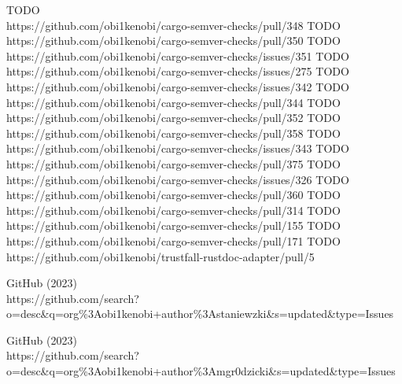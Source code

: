 \documentclass[licencjacka,en]{pracamgr}
\begin{document}
\begin{thebibliography}{99}
 TODO \\ https://github.com/obi1kenobi/cargo-semver-checks/pull/348
 TODO \\ https://github.com/obi1kenobi/cargo-semver-checks/pull/350
 TODO \\ https://github.com/obi1kenobi/cargo-semver-checks/issues/351
 TODO \\ https://github.com/obi1kenobi/cargo-semver-checks/issues/275
 TODO \\ https://github.com/obi1kenobi/cargo-semver-checks/issues/342
 TODO \\ https://github.com/obi1kenobi/cargo-semver-checks/pull/344
 TODO \\ https://github.com/obi1kenobi/cargo-semver-checks/pull/352
 TODO \\ https://github.com/obi1kenobi/cargo-semver-checks/pull/358
 TODO \\ https://github.com/obi1kenobi/cargo-semver-checks/issues/343
 TODO \\ https://github.com/obi1kenobi/cargo-semver-checks/pull/375
 TODO \\ https://github.com/obi1kenobi/cargo-semver-checks/issues/326
 TODO \\ https://github.com/obi1kenobi/cargo-semver-checks/pull/360
 TODO \\ https://github.com/obi1kenobi/cargo-semver-checks/pull/314
 TODO \\ https://github.com/obi1kenobi/cargo-semver-checks/pull/155
 TODO \\ https://github.com/obi1kenobi/cargo-semver-checks/pull/171
 TODO \\ https://github.com/obi1kenobi/trustfall-rustdoc-adapter/pull/5

 GitHub (2023) \\
	https://github.com/search?o=desc\&q=org\%3Aobi1kenobi+author\%3Astaniewzki\&s=updated\&type=Issues

 GitHub (2023) \\
	https://github.com/search?o=desc\&q=org\%3Aobi1kenobi+author\%3Amgr0dzicki\&s=updated\&type=Issues


\end{thebibliography}
\end{document}

